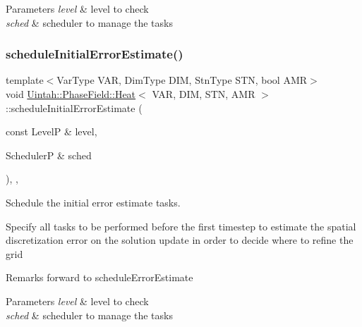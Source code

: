\begin{DoxyParams}{Parameters}
{\em level} & level to check \\
\hline
{\em sched} & scheduler to manage the tasks \\
\hline
\end{DoxyParams}
\mbox{\label{classUintah_1_1PhaseField_1_1Heat_a2c1ab4a698b92a06cd840786df5acc0a}} 
\subsubsection{\texorpdfstring{schedule\+Initial\+Error\+Estimate()}{scheduleInitialErrorEstimate()}}
{\footnotesize\ttfamily template$<$Var\+Type V\+AR, Dim\+Type D\+IM, Stn\+Type S\+TN, bool A\+MR$>$ \\
void \hyperlink{classUintah_1_1PhaseField_1_1Heat}{Uintah\+::\+Phase\+Field\+::\+Heat}$<$ V\+AR, D\+IM, S\+TN, A\+MR $>$\+::schedule\+Initial\+Error\+Estimate (\begin{DoxyParamCaption}\item[{const LevelP \&}]{level,  }\item[{SchedulerP \&}]{sched }\end{DoxyParamCaption})\hspace{0.3cm}{\ttfamily [override]}, {\ttfamily [protected]}, {\ttfamily [virtual]}}



Schedule the initial error estimate tasks. 

Specify all tasks to be performed before the first timestep to estimate the spatial discretization error on the solution update in order to decide where to refine the grid

\begin{DoxyRemark}{Remarks}
forward to schedule\+Error\+Estimate
\end{DoxyRemark}

\begin{DoxyParams}{Parameters}
{\em level} & level to check \\
\hline
{\em sched} & scheduler to manage the tasks \\
\hline
\end{DoxyParams}
\mbox{\label{classUintah_1_1PhaseField_1_1Heat_aa6b857a08f51311bba30771145176601}} 
